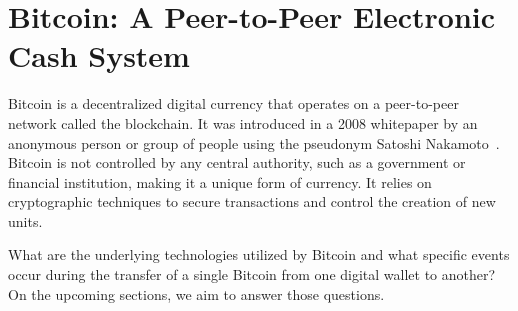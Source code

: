 \section{Bitcoin: A Peer-to-Peer Electronic Cash System}
Bitcoin is a decentralized digital currency that operates on a peer-to-peer network called the blockchain. It was introduced in a 2008
whitepaper by an anonymous person or group of people using the pseudonym Satoshi Nakamoto~\cite{nakamoto2008bitcoin}. Bitcoin is not
controlled by any central authority, such as a government or financial institution, making it a unique form of currency. It relies on
cryptographic techniques to secure transactions and control the creation of new units.

What are the underlying technologies utilized by Bitcoin and what specific events occur during the transfer of a single Bitcoin from one
digital wallet to another? On the upcoming sections, we aim to answer those questions.







